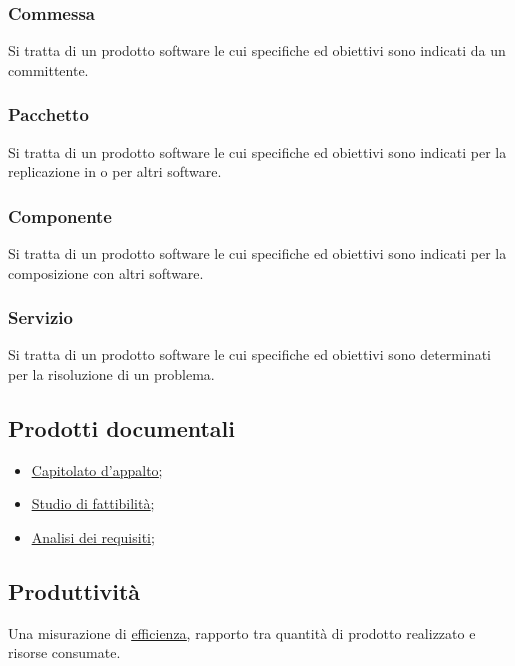 		\subsubsection{Commessa}
		Si tratta di un prodotto software le cui specifiche ed obiettivi sono indicati da un committente.
	
		\subsubsection{Pacchetto}
		Si tratta di un prodotto software le cui specifiche ed obiettivi sono indicati per la replicazione in o per altri software.
		
		\subsubsection{Componente}
		Si tratta di un prodotto software le cui specifiche ed obiettivi sono indicati per la composizione con altri software.
		
		\subsubsection{Servizio}
		Si tratta di un prodotto software le cui specifiche ed obiettivi sono determinati per la risoluzione di un problema.
	
	\subsection{Prodotti documentali}	
	\label{sec:prodottidocumentali}
	\begin{itemize}  
	\item \underline{\hyperref[sec:capitolato]{Capitolato d'appalto};}
	\item \underline{\hyperref[sec:studiofattibilita]{Studio di fattibilità}};
	\item \underline{\hyperref[sec:analisirequisiti]{Analisi dei requisiti}};
	\end{itemize}	
		
	\subsection{Produttività}	
	\label{sec:produttivita}
	Una misurazione di \underline{\hyperref[sec:efficienza]{efficienza}}, rapporto tra quantità di prodotto realizzato e risorse consumate.

